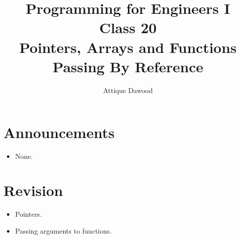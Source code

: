 \documentclass[12pt,a4paper]{article}
\title{\vspace{-2cm}Programming for Engineers I\\Class 20\\Pointers, Arrays and Functions\\Passing By Reference}
\author{Attique Dawood}
\begin{document}
\maketitle
\section{Announcements}
\begin{itemize}
\item None.
\end{itemize}
\section{Revision}
\begin{itemize}
\item Pointers.
\item Passing arguments to functions.
\end{itemize}
\end{document}

